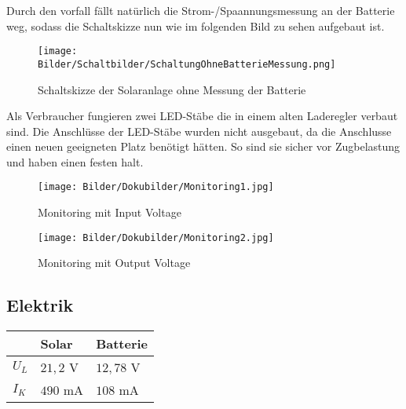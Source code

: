 \documentclass [ngerman]{mucproc}
\begin{document}
Durch den vorfall fällt natürlich die Strom-/Spaannungsmessung an der Batterie weg, sodass die Schaltskizze nun wie im folgenden Bild zu sehen aufgebaut ist.


	\begin{figure}
		\centering
		\texttt{[image: Bilder/Schaltbilder/SchaltungOhneBatterieMessung.png]}
		\caption{Schaltskizze der Solaranlage ohne Messung der Batterie}
		\label{fig: Schaltskizze Solaranlage neu}
	\end{figure}

Als Verbraucher fungieren zwei LED-Stäbe die in einem alten Laderegler verbaut sind. Die Anschlüsse der LED-Stäbe wurden nicht ausgebaut, da die Anschlusse einen neuen geeigneten Platz benötigt hätten. So sind sie sicher vor Zugbelastung und haben einen festen halt. 
		
				
	
		\begin{figure}
			\centering
			\texttt{[image: Bilder/Dokubilder/Monitoring1.jpg]}
			\caption{Monitoring mit Input Voltage}
			\label{fig:Monitoring1}
		\end{figure}
		
		\begin{figure}
			\centering
			\texttt{[image: Bilder/Dokubilder/Monitoring2.jpg]}
			\caption{Monitoring mit Output Voltage}
			\label{fig:Monitoring2}
		\end{figure}

\subsection{Elektrik}
		
		\begin{table}[]
		\begin{tabular}{|l|l|l|}
		\hline
  			  	& Solar  & Batterie \\ \hline
			$U_L$ & $21,2$ V & $12,78$ V  \\ \hline
			$I_K$ & $490$ mA & $108$ mA   \\ \hline 
		\end{tabular}
		\end{table}
		
\end{document}
